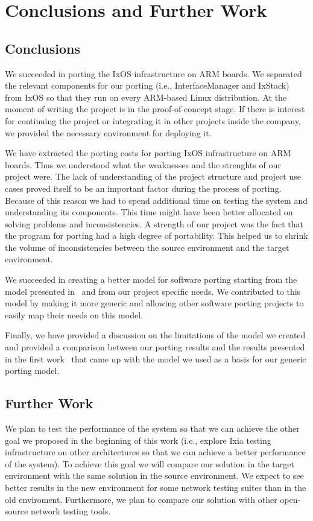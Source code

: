 \section{Conclusions and Further Work}

\subsection{Conclusions}
We succeeded in porting the IxOS infrastructure on ARM boards. We separated the
relevant components for our porting (i.e., InterfaceManager and IxStack) from
IxOS so that they run on every ARM-based Linux distribution. At the moment of
writing the project is in the proof-of-concept stage. If there is interest for
continuing the project or integrating it in other projects inside the company,
we provided the necessary environment for deploying it.

We have extracted the porting costs for porting IxOS infrastructure on ARM
boards. Thus we understood what the weaknesses and the strenghts of our project
were. The lack of understanding of the project structure and project use cases
proved itself to be an important factor during the process of porting. Because
of this reason we had to spend additional time on testing the system and
understanding its components. This time might have been better allocated on
solving problems and inconsistencies. A strength of our project was the fact
that the program for porting had a high degree of portability. This helped us to
shrink the volume of inconsistencies between the source environment and the
target environment.

We succeeded in creating a better model for software porting starting from the
model presented in~\cite{b1,b2} and from our project specific needs. We
contributed to this model by making it more generic and allowing other software
porting projects to easily map their needs on this model.

Finally, we have provided a discussion on the limitations of the model we
created and provided a comparison between our porting results and the results
presented in the first work~\cite{b1} that came up with the model we used as a
basis for our generic porting model.

\subsection{Further Work}

We plan to test the performance of the system so that we can achieve the other
goal we proposed in the beginning of this work (i.e., explore Ixia testing
infrastructure on other architectures so that we can achieve a better
performance of the system). To achieve this goal we will compare our solution in
the target environment with the same solution in the source environment. We
expect to see better results in the new environment for some network testing
suites than in the old enviroment. Furthermore, we plan to compare our solution
with other open-source network testing tools.

